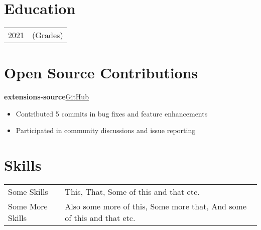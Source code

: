 \documentclass[a4paper,12pt]{article}
\newenvironment{itemList}[2]
    {
    \noindent\hspace{1em}\textbf{#1}\hfill#2\\[3.75pt]
    \begin{minipage}[t]{\linewidth}
    \begin{itemize}[nosep,after=\strut, leftmargin=2em, itemsep=3pt,label={}]
    }
    {
    \end{itemize}
    \end{minipage}
    }
\begin{document}
\section{Education}
\begin{tabularx}{\linewidth}{@{}l X@{}}
    2021 & \hfill  (Grades) \\
\end{tabularx}

\section{Open Source Contributions}
\begin{itemList}{extensions-source}{\href{https://github.com/keiyoushi/extensions-source}{GitHub}}
    \item Contributed 5 commits in bug fixes and feature enhancements
    \item Participated in community discussions and issue reporting
\end{itemList}

\section{Skills}
\begin{tabularx}{\linewidth}{@{}l X@{}}
    Some Skills      & \normalsize{This, That, Some of this and that etc.}                                 \\
    Some More Skills & \normalsize{Also some more of this, Some more that, And some of this and that etc.} \\
\end{tabularx}

\vfill
{}
\end{document}
